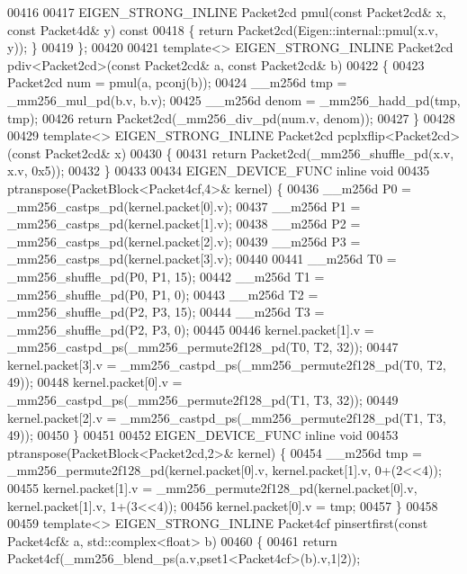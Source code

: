 \begin{DoxyCode}
00416 
00417   EIGEN\_STRONG\_INLINE Packet2cd pmul(\textcolor{keyword}{const} Packet2cd& x, \textcolor{keyword}{const} Packet4d& y)\textcolor{keyword}{ const}
00418 \textcolor{keyword}{  }\{ \textcolor{keywordflow}{return} Packet2cd(Eigen::internal::pmul(x.v, y)); \}
00419 \};
00420 
00421 \textcolor{keyword}{template}<> EIGEN\_STRONG\_INLINE Packet2cd pdiv<Packet2cd>(\textcolor{keyword}{const} Packet2cd& a, \textcolor{keyword}{const} Packet2cd& b)
00422 \{
00423   Packet2cd num = pmul(a, pconj(b));
00424   \_\_m256d tmp = \_mm256\_mul\_pd(b.v, b.v);
00425   \_\_m256d denom = \_mm256\_hadd\_pd(tmp, tmp);
00426   \textcolor{keywordflow}{return} Packet2cd(\_mm256\_div\_pd(num.v, denom));
00427 \}
00428 
00429 \textcolor{keyword}{template}<> EIGEN\_STRONG\_INLINE Packet2cd pcplxflip<Packet2cd>(\textcolor{keyword}{const} Packet2cd& x)
00430 \{
00431   \textcolor{keywordflow}{return} Packet2cd(\_mm256\_shuffle\_pd(x.v, x.v, 0x5));
00432 \}
00433 
00434 EIGEN\_DEVICE\_FUNC \textcolor{keyword}{inline} \textcolor{keywordtype}{void}
00435 ptranspose(PacketBlock<Packet4cf,4>& kernel) \{
00436   \_\_m256d P0 = \_mm256\_castps\_pd(kernel.packet[0].v);
00437   \_\_m256d P1 = \_mm256\_castps\_pd(kernel.packet[1].v);
00438   \_\_m256d P2 = \_mm256\_castps\_pd(kernel.packet[2].v);
00439   \_\_m256d P3 = \_mm256\_castps\_pd(kernel.packet[3].v);
00440 
00441   \_\_m256d T0 = \_mm256\_shuffle\_pd(P0, P1, 15);
00442   \_\_m256d T1 = \_mm256\_shuffle\_pd(P0, P1, 0);
00443   \_\_m256d T2 = \_mm256\_shuffle\_pd(P2, P3, 15);
00444   \_\_m256d T3 = \_mm256\_shuffle\_pd(P2, P3, 0);
00445 
00446   kernel.packet[1].v = \_mm256\_castpd\_ps(\_mm256\_permute2f128\_pd(T0, T2, 32));
00447   kernel.packet[3].v = \_mm256\_castpd\_ps(\_mm256\_permute2f128\_pd(T0, T2, 49));
00448   kernel.packet[0].v = \_mm256\_castpd\_ps(\_mm256\_permute2f128\_pd(T1, T3, 32));
00449   kernel.packet[2].v = \_mm256\_castpd\_ps(\_mm256\_permute2f128\_pd(T1, T3, 49));
00450 \}
00451 
00452 EIGEN\_DEVICE\_FUNC \textcolor{keyword}{inline} \textcolor{keywordtype}{void}
00453 ptranspose(PacketBlock<Packet2cd,2>& kernel) \{
00454   \_\_m256d tmp = \_mm256\_permute2f128\_pd(kernel.packet[0].v, kernel.packet[1].v, 0+(2<<4));
00455   kernel.packet[1].v = \_mm256\_permute2f128\_pd(kernel.packet[0].v, kernel.packet[1].v, 1+(3<<4));
00456  kernel.packet[0].v = tmp;
00457 \}
00458 
00459 \textcolor{keyword}{template}<> EIGEN\_STRONG\_INLINE Packet4cf pinsertfirst(\textcolor{keyword}{const} Packet4cf& a, std::complex<float> b)
00460 \{
00461   \textcolor{keywordflow}{return} Packet4cf(\_mm256\_blend\_ps(a.v,pset1<Packet4cf>(b).v,1|2));

\end{DoxyCode}
